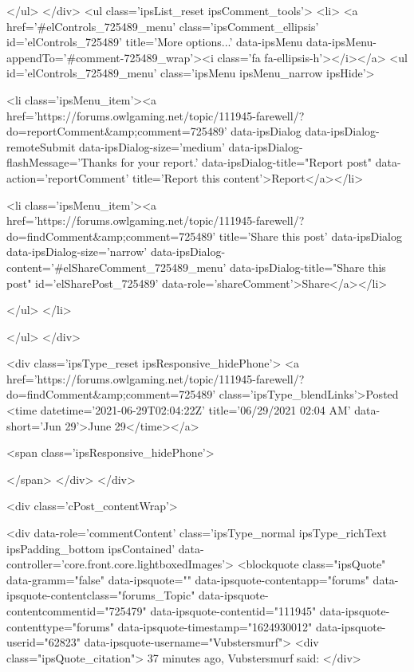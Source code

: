 					
					
					
					
				</ul>
			</div>
			<ul class='ipsList_reset ipsComment_tools'>
				<li>
					<a href='#elControls_725489_menu' class='ipsComment_ellipsis' id='elControls_725489' title='More options...' data-ipsMenu data-ipsMenu-appendTo='#comment-725489_wrap'><i class='fa fa-ellipsis-h'></i></a>
					<ul id='elControls_725489_menu' class='ipsMenu ipsMenu_narrow ipsHide'>
						
							<li class='ipsMenu_item'><a href='https://forums.owlgaming.net/topic/111945-farewell/?do=reportComment&amp;comment=725489' data-ipsDialog data-ipsDialog-remoteSubmit data-ipsDialog-size='medium' data-ipsDialog-flashMessage='Thanks for your report.' data-ipsDialog-title="Report post" data-action='reportComment' title='Report this content'>Report</a></li>
						
						
							<li class='ipsMenu_item'><a href='https://forums.owlgaming.net/topic/111945-farewell/?do=findComment&amp;comment=725489' title='Share this post' data-ipsDialog data-ipsDialog-size='narrow' data-ipsDialog-content='#elShareComment_725489_menu' data-ipsDialog-title="Share this post" id='elSharePost_725489' data-role='shareComment'>Share</a></li>
						
                        
						
						
						
							
								
							
							
							
							
							
							
						
					</ul>
				</li>
				
			</ul>
		</div>

		<div class='ipsType_reset ipsResponsive_hidePhone'>
			<a href='https://forums.owlgaming.net/topic/111945-farewell/?do=findComment&amp;comment=725489' class='ipsType_blendLinks'>Posted <time datetime='2021-06-29T02:04:22Z' title='06/29/2021 02:04  AM' data-short='Jun 29'>June 29</time></a> 
			
			<span class='ipsResponsive_hidePhone'>
				
				
			</span>
		</div>
	</div>

	

    

	<div class='cPost_contentWrap'>
		
		<div data-role='commentContent' class='ipsType_normal ipsType_richText ipsPadding_bottom ipsContained' data-controller='core.front.core.lightboxedImages'>
			<blockquote class="ipsQuote" data-gramm="false" data-ipsquote="" data-ipsquote-contentapp="forums" data-ipsquote-contentclass="forums_Topic" data-ipsquote-contentcommentid="725479" data-ipsquote-contentid="111945" data-ipsquote-contenttype="forums" data-ipsquote-timestamp="1624930012" data-ipsquote-userid="62823" data-ipsquote-username="Vubstersmurf">
	<div class="ipsQuote_citation">
		37 minutes ago, Vubstersmurf said:
	</div>

